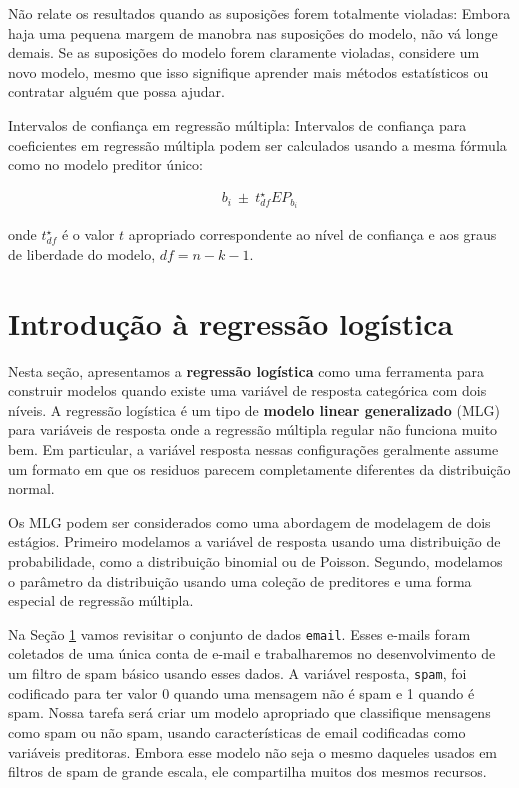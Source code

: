 \documentclass[
]{book}
\theoremstyle{definition}
\theoremstyle{definition}
\theoremstyle{definition}
\theoremstyle{definition}
\theoremstyle{remark}
\begin{document}
Não relate os resultados quando as suposições forem totalmente violadas: Embora haja uma pequena margem de manobra nas suposições do modelo, não vá longe demais. Se as suposições do modelo forem claramente violadas, considere um novo modelo, mesmo que isso signifique aprender mais métodos estatísticos ou contratar alguém que possa ajudar.

Intervalos de confiança em regressão múltipla: Intervalos de confiança para coeficientes em regressão múltipla podem ser calculados usando a mesma fórmula como no modelo preditor único:

\begin{align*}
b_i \ \pm\ t_{df}^{\star}EP_{b_{i}}
\end{align*}

onde \(t_{df}^{\star}\) é o valor \(t\) apropriado correspondente ao nível de confiança e aos graus de liberdade do modelo, \(df=n-k-1\).

\hypertarget{logisticRegression}{%
\section{Introdução à regressão logística}\label{logisticRegression}}

Nesta seção, apresentamos a \textbf{regressão logística} como uma ferramenta para construir modelos quando existe uma variável de resposta categórica com dois níveis. A regressão logística é um tipo de \textbf{modelo linear generalizado} (MLG) para variáveis de resposta onde a regressão múltipla regular não funciona muito bem. Em particular, a variável resposta nessas configurações geralmente assume um formato em que os residuos parecem completamente diferentes da distribuição normal.

Os MLG podem ser considerados como uma abordagem de modelagem de dois estágios. Primeiro modelamos a variável de resposta usando uma distribuição de probabilidade, como a distribuição binomial ou de Poisson. Segundo, modelamos o parâmetro da distribuição usando uma coleção de preditores e uma forma especial de regressão múltipla.

Na Seção \ref{logisticRegression} vamos revisitar o conjunto de dados \texttt{email}. Esses e-mails foram coletados de uma única conta de e-mail e trabalharemos no desenvolvimento de um filtro de spam básico usando esses dados. A variável resposta, \texttt{spam}, foi codificado para ter valor 0 quando uma mensagem não é spam e 1 quando é spam. Nossa tarefa será criar um modelo apropriado que classifique mensagens como spam ou não spam, usando características de email codificadas como variáveis preditoras. Embora esse modelo não seja o mesmo daqueles usados em filtros de spam de grande escala, ele compartilha muitos dos mesmos recursos.
\end{document}
